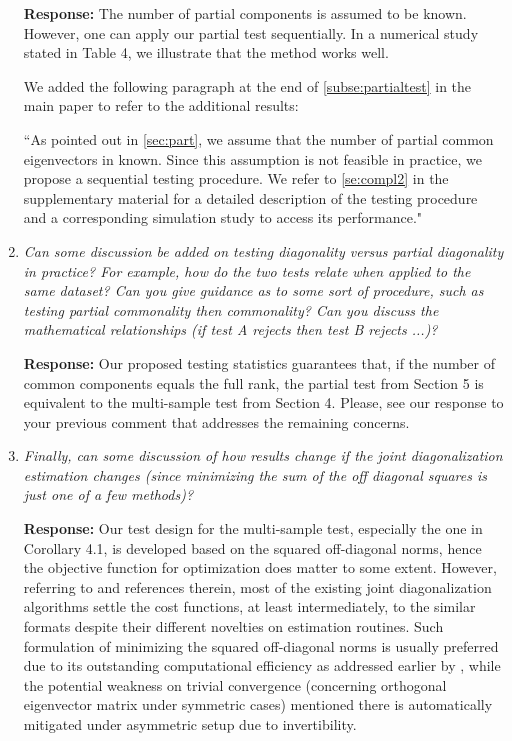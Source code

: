\documentclass[12pt]{article}
\numberwithin{equation}{section}
\numberwithin{table}{section}
\numberwithin{thm}{section}
\numberwithin{defn}{section}
\numberwithin{lem}{section}
\numberwithin{prop}{section}
\numberwithin{cor}{section}
\numberwithin{rem}{section}
\begin{document}
\begin{enumerate}
\textbf{Response:}
The number of partial components is assumed to be known. However, one can apply our partial test sequentially. In a numerical study stated in Table 4, we illustrate that the method works well.

We added the following paragraph at the end of \autoref{subse:partialtest} in the main paper to refer to the additional results:

``As pointed out in \autoref{sec:part}, we assume that the number of partial common eigenvectors in known. Since this assumption is not feasible in practice, we propose a sequential testing procedure. We refer to \autoref{se:compl2} in the supplementary material for a detailed description of the testing procedure and a corresponding simulation study to access its performance."


\item
\textit{Can some discussion be added on testing diagonality versus partial diagonality in practice? For example, how do the two tests relate when applied to the same dataset? Can you give guidance as to some sort of procedure, such as testing partial commonality then commonality?  Can you discuss the mathematical relationships (if test A rejects then test B rejects ...)?}

\textbf{Response:} 
Our proposed testing statistics guarantees that, if the number of common components equals the full rank, the partial test from Section 5 is equivalent to the multi-sample test from Section 4. Please, see our response to your previous comment that addresses the remaining concerns.

\item
\textit{Finally, can some discussion of how results change if the joint diagonalization estimation changes (since minimizing the sum of the off diagonal squares is just one of a few methods)?}

\textbf{Response:}
Our test design for the multi-sample test, especially the one in Corollary 4.1, is developed based on the squared off-diagonal norms, hence the objective function for optimization does matter to some extent. However, referring to \cite{andre} and references therein, most of the existing joint diagonalization algorithms settle the cost functions, at least intermediately, to the similar formats despite their different novelties on estimation routines. Such formulation of minimizing the squared off-diagonal norms is usually preferred due to its outstanding computational efficiency as addressed earlier by \cite{Ziehe}, while the potential weakness on trivial convergence (concerning orthogonal eigenvector matrix under symmetric cases) mentioned there is automatically mitigated under asymmetric setup due to invertibility.

\end{enumerate}
\end{document}
